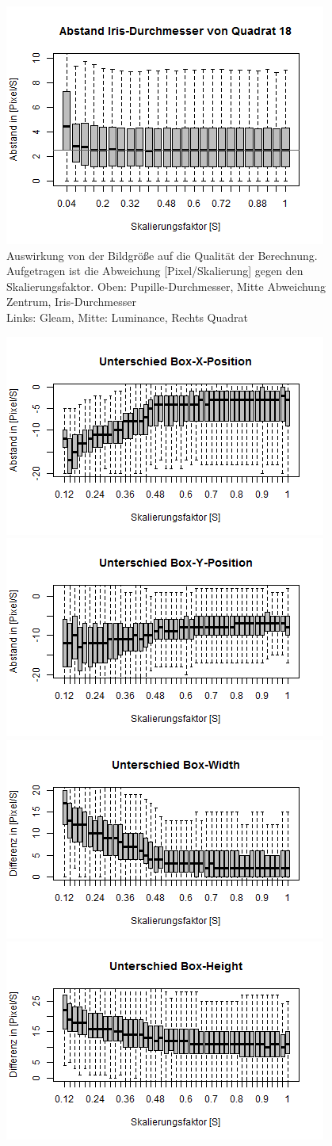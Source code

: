 \begin{landscape}
\begin{figure}
	\includegraphics[width=0.32\linewidth]{Eye_Img_Box/Qua_Radius_I_18}
	\caption{Auswirkung von der Bildgröße auf die Qualität der Berechnung. Aufgetragen ist die Abweichung [Pixel/Skalierung] gegen den Skalierungsfaktor. Oben: Pupille-Durchmesser, Mitte Abweichung Zentrum, Iris-Durchmesser\\
		Links: Gleam, Mitte: Luminance, Rechts Quadrat}
	\label{ElSe_scall}
\end{figure}
\begin{figure}
	\centering
	\includegraphics[width=0.49\linewidth]{Eye_Img_Box/Openface_BoxX}
	\includegraphics[width=0.49\linewidth]{Eye_Img_Box/Openface_BoxY}\\
	\includegraphics[width=0.49\linewidth]{Eye_Img_Box/Openface_BoxW}
	\includegraphics[width=0.49\linewidth]{Eye_Img_Box/Openface_BoxH}

\end{figure}
\end{landscape}
